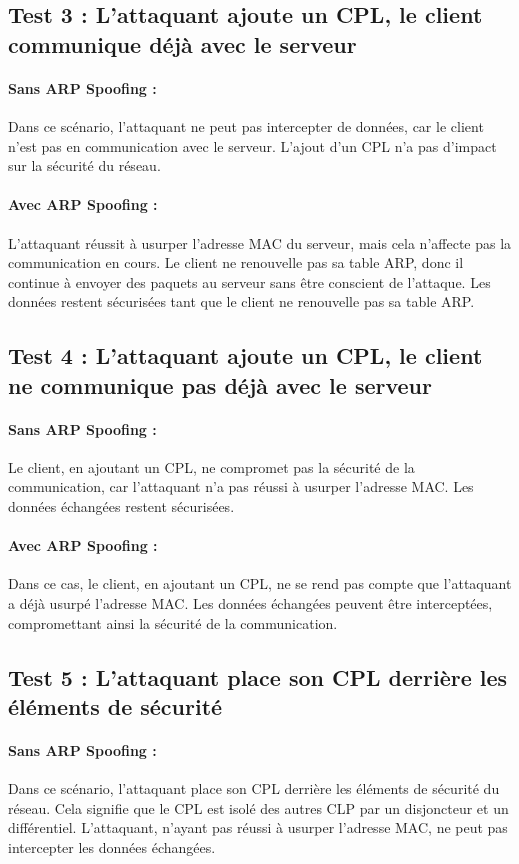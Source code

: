 \documentclass[a4paper,twocolumn]{report}
\begin{document}
\subsection{Test 3 : L'attaquant ajoute un CPL, le client communique déjà avec le serveur}
\paragraph{Sans ARP Spoofing :}
Dans ce scénario, l'attaquant ne peut pas intercepter de données,
car le client n'est pas en communication avec le serveur.
L'ajout d'un CPL n'a pas d'impact sur la sécurité du réseau.

\paragraph{Avec ARP Spoofing :}
L'attaquant réussit à usurper l'adresse MAC du serveur,
mais cela n'affecte pas la communication en cours.
Le client ne renouvelle pas sa table ARP, donc il continue à envoyer des paquets
au serveur sans être conscient de l'attaque. Les données restent sécurisées tant
que le client ne renouvelle pas sa table ARP.

\subsection{Test 4 : L'attaquant ajoute un CPL, le client ne communique pas déjà avec le serveur}
\paragraph{Sans ARP Spoofing :}
Le client, en ajoutant un CPL, ne compromet pas la sécurité de la communication,
car l'attaquant n'a pas réussi à usurper l'adresse MAC. Les données échangées restent sécurisées.

\paragraph{Avec ARP Spoofing :}
Dans ce cas, le client, en ajoutant un CPL, ne se rend pas compte que l'attaquant a déjà usurpé l'adresse MAC.
Les données échangées peuvent être interceptées, compromettant ainsi la sécurité de la communication.

\subsection{Test 5 : L'attaquant place son CPL derrière les éléments de sécurité}
\paragraph{Sans ARP Spoofing :}
Dans ce scénario, l'attaquant place son CPL derrière les éléments de sécurité du réseau. Cela signifie que le CPL est isolé des autres CLP par un disjoncteur et un différentiel.
L'attaquant, n'ayant pas réussi à usurper l'adresse MAC, ne peut pas intercepter les données échangées.
\end{document}
